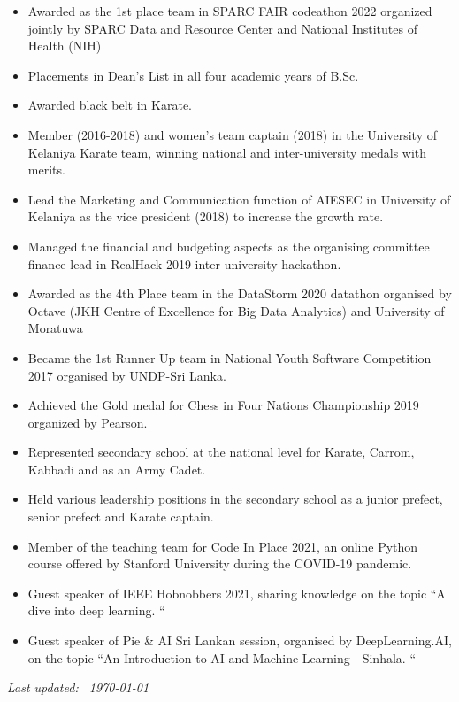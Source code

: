 \documentclass[10pt,a4paper,ragged2e,withhyper]{altacv}
\begin{document}
\medskip

\begin{itemize}
    \item Awarded as the 1st place team in SPARC FAIR codeathon 2022 organized jointly by SPARC Data and Resource Center and National Institutes of Health (NIH)
    \item Placements in Dean’s List in all four academic years of B.Sc.
    \item Awarded black belt in Karate.
    \item Member (2016-2018) and women's team captain (2018) in the University of Kelaniya Karate team, winning national and inter-university medals with merits. 
    \item Lead the Marketing and Communication function of AIESEC in University of Kelaniya as the vice president (2018) to increase the growth rate.
    \item Managed the financial and budgeting aspects as the organising committee finance lead in RealHack 2019 inter-university hackathon.
    \item Awarded as the 4th Place team in the DataStorm 2020 datathon organised by Octave (JKH Centre of Excellence for Big Data Analytics) and University of Moratuwa
    \item Became the 1st Runner Up team in National Youth Software Competition 2017 organised by UNDP-Sri Lanka.
    \item Achieved the Gold medal for Chess in Four Nations Championship 2019 organized by Pearson.
    \item Represented secondary school at the national level for Karate, Carrom, Kabbadi and as an Army Cadet.
    \item Held various leadership positions in the secondary school as a junior prefect, senior prefect and Karate captain.
\end{itemize}

\medskip

\begin{itemize}
    \item Member of the teaching team for Code In Place 2021, an online Python course offered by Stanford University during the COVID-19 pandemic. 
    \item Guest speaker of IEEE Hobnobbers 2021, sharing knowledge on the topic ``A dive into deep learning. ``
    \item Guest speaker of Pie \& AI Sri Lankan session, organised by DeepLearning.AI, on the topic ``An Introduction to AI and Machine Learning - Sinhala. ``
\end{itemize}

\medskip



\vfill
\begin{flushright}
\flushright
\footnotesize{\emph{Last updated: ~\today }}
\end{flushright}
\end{document}
